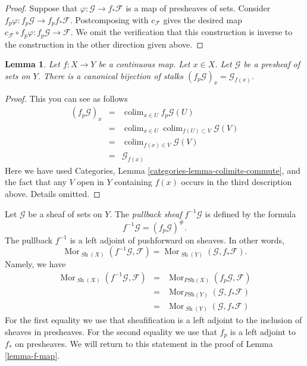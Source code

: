 \documentclass{stacks-project}
\theoremstyle{plain}
\newtheorem{lemma}[subsection]{Lemma}
\theoremstyle{definition}
\theoremstyle{remark}
\numberwithin{equation}{subsection}
\def\colim{\mathop{\mathrm{colim}}\nolimits}
\def\Mor{\mathop{\mathrm{Mor}}\nolimits}
\def\Sh{\mathop{\mathit{Sh}}\nolimits}
\begin{document}
\begin{proof}
\medskip\noindent
Suppose that $\varphi : \mathcal{G} \to f_*\mathcal{F}$
is a map of presheaves of sets. Consider $f_p\varphi :
f_p \mathcal{G} \to f_p f_* \mathcal{F}$.
Postcomposing with $c_\mathcal{F}$ gives the desired map
$c_\mathcal{F} \circ f_p\varphi : f_p\mathcal{G} \to \mathcal{F}$.
We omit the verification that this construction is inverse
to the construction in the other direction given above.
\end{proof}

\begin{lemma}
\label{lemma-stalk-pullback-presheaf}
Let $f : X \to Y$ be a continuous map.
Let $x \in X$. Let $\mathcal{G}$ be a presheaf of sets on $Y$.
There is a canonical bijection of stalks
$(f_p\mathcal{G})_x = \mathcal{G}_{f(x)}$.
\end{lemma}

\begin{proof}
This you can see as follows
\begin{eqnarray*}
(f_p\mathcal{G})_x
& = &
\colim_{x \in U} f_p\mathcal{G}(U) \\
& = &
\colim_{x \in U} \colim_{f(U) \subset V} \mathcal{G}(V) \\
& = &
\colim_{f(x) \in V} \mathcal{G}(V) \\
& = &
\mathcal{G}_{f(x)}
\end{eqnarray*}
Here we have used
Categories, Lemma \ref{categories-lemma-colimits-commute},
and the fact that any $V$ open in $Y$ containing $f(x)$
occurs in the third description above. Details omitted.
\end{proof}

\noindent
Let $\mathcal{G}$ be a sheaf of sets on $Y$.
The {\it pullback sheaf} $f^{-1}\mathcal{G}$ is defined
by the formula
$$
f^{-1}\mathcal{G} = (f_p\mathcal{G})^\# .
$$
The pullback $f^{-1}$ is a left adjoint of
pushforward on sheaves. In other words,
$$
\Mor_{\Sh(X)}(f^{-1}\mathcal{G}, \mathcal{F})
=
\Mor_{\Sh(Y)}(\mathcal{G}, f_*\mathcal{F}).
$$
Namely, we have
\begin{eqnarray*}
\Mor_{\Sh(X)}(f^{-1}\mathcal{G}, \mathcal{F})
& = &
\Mor_{\textit{PSh}(X)}(f_p\mathcal{G}, \mathcal{F}) \\
& = &
\Mor_{\textit{PSh}(Y)}(\mathcal{G}, f_*\mathcal{F}) \\
& = &
\Mor_{\Sh(Y)}(\mathcal{G}, f_*\mathcal{F})
\end{eqnarray*}
For the first equality we use that sheafification is a left adjoint
to the inclusion of sheaves in presheaves. For the second equality
we use that $f_p$ is a left adjoint to $f_*$ on presheaves. We will return
to this statement in the proof of Lemma \ref{lemma-f-map}.
\end{document}
